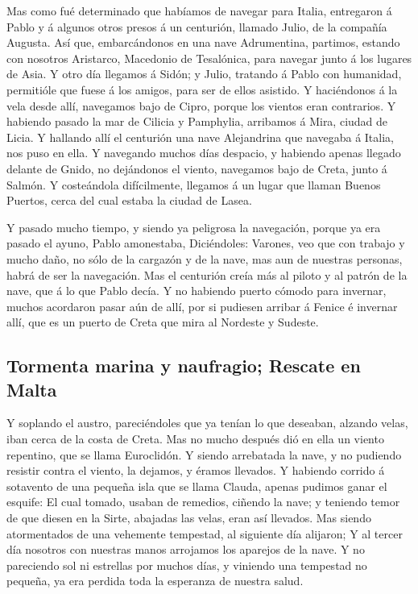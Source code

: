  Mas como fué determinado que habíamos de navegar para
Italia, entregaron á Pablo y á algunos otros presos á un centurión,
llamado Julio, de la compañía Augusta.  Así que,
embarcándonos en una nave Adrumentina, partimos, estando con nosotros
Aristarco, Macedonio de Tesalónica, para navegar junto á los lugares de
Asia.  Y otro día llegamos á Sidón; y Julio, tratando á
Pablo con humanidad, permitióle que fuese á los amigos, para ser de
ellos asistido.  Y haciéndonos á la vela desde allí,
navegamos bajo de Cipro, porque los vientos eran contrarios.
 Y habiendo pasado la mar de Cilicia y Pamphylia,
arribamos á Mira, ciudad de Licia.  Y hallando allí el
centurión una nave Alejandrina que navegaba á Italia, nos puso en ella.
 Y navegando muchos días despacio, y habiendo apenas
llegado delante de Gnido, no dejándonos el viento, navegamos bajo de
Creta, junto á Salmón.  Y costeándola difícilmente,
llegamos á un lugar que llaman Buenos Puertos, cerca del cual estaba la
ciudad de Lasea.

 Y pasado mucho tiempo, y siendo ya peligrosa la
navegación, porque ya era pasado el ayuno, Pablo amonestaba,
 Diciéndoles: Varones, veo que con trabajo y mucho daño,
no sólo de la cargazón y de la nave, mas aun de nuestras personas, habrá
de ser la navegación.  Mas el centurión creía más al
piloto y al patrón de la nave, que á lo que Pablo decía. 
Y no habiendo puerto cómodo para invernar, muchos acordaron pasar aún de
allí, por si pudiesen arribar á Fenice é invernar allí, que es un puerto
de Creta que mira al Nordeste y Sudeste.

\hypertarget{tormenta-marina-y-naufragio-rescate-en-malta}{%
\subsection{Tormenta marina y naufragio; Rescate en
Malta}\label{tormenta-marina-y-naufragio-rescate-en-malta}}

 Y soplando el austro, pareciéndoles que ya tenían lo que
deseaban, alzando velas, iban cerca de la costa de Creta.
 Mas no mucho después dió en ella un viento repentino,
que se llama Euroclidón.  Y siendo arrebatada la nave, y
no pudiendo resistir contra el viento, la dejamos, y éramos llevados.
 Y habiendo corrido á sotavento de una pequeña isla que
se llama Clauda, apenas pudimos ganar el esquife:  El
cual tomado, usaban de remedios, ciñendo la nave; y teniendo temor de
que diesen en la Sirte, abajadas las velas, eran así llevados.
 Mas siendo atormentados de una vehemente tempestad, al
siguiente día alijaron;  Y al tercer día nosotros con
nuestras manos arrojamos los aparejos de la nave.  Y no
pareciendo sol ni estrellas por muchos días, y viniendo una tempestad no
pequeña, ya era perdida toda la esperanza de nuestra salud.

